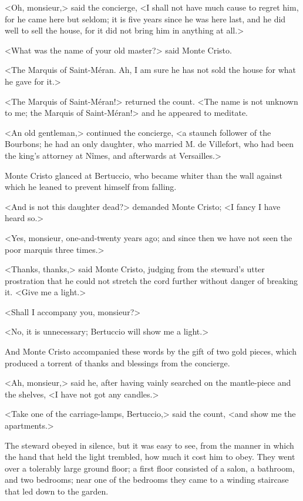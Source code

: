  <Oh, monsieur,> said the concierge, <I shall not have much cause to regret him, for he came here but seldom; it is five years since he was here last, and he did well to sell the house, for it did not bring him in anything at all.> 

 <What was the name of your old master?> said Monte Cristo. 

 <The Marquis of Saint-Méran. Ah, I am sure he has not sold the house for what he gave for it.> 

 <The Marquis of Saint-Méran!> returned the count. <The name is not unknown to me; the Marquis of Saint-Méran!> and he appeared to meditate. 

 <An old gentleman,> continued the concierge, <a staunch follower of the Bourbons; he had an only daughter, who married M. de Villefort, who had been the king's attorney at Nîmes, and afterwards at Versailles.> 

 Monte Cristo glanced at Bertuccio, who became whiter than the wall against which he leaned to prevent himself from falling. 

 <And is not this daughter dead?> demanded Monte Cristo; <I fancy I have heard so.> 

 <Yes, monsieur, one-and-twenty years ago; and since then we have not seen the poor marquis three times.> 

 <Thanks, thanks,> said Monte Cristo, judging from the steward's utter prostration that he could not stretch the cord further without danger of breaking it. <Give me a light.> 

 <Shall I accompany you, monsieur?> 

 <No, it is unnecessary; Bertuccio will show me a light.> 

 And Monte Cristo accompanied these words by the gift of two gold pieces, which produced a torrent of thanks and blessings from the concierge. 

 <Ah, monsieur,> said he, after having vainly searched on the mantle-piece and the shelves, <I have not got any candles.> 

 <Take one of the carriage-lamps, Bertuccio,> said the count, <and show me the apartments.> 

 The steward obeyed in silence, but it was easy to see, from the manner in which the hand that held the light trembled, how much it cost him to obey. They went over a tolerably large ground floor; a first floor consisted of a salon, a bathroom, and two bedrooms; near one of the bedrooms they came to a winding staircase that led down to the garden. 

